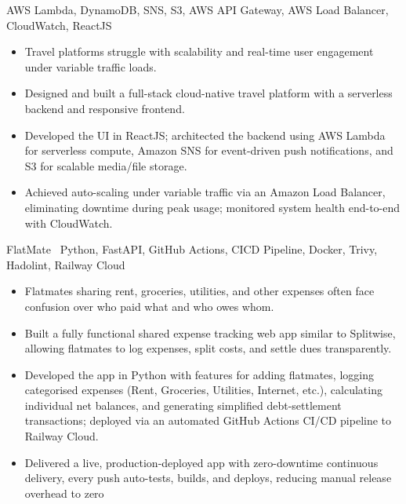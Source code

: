\documentclass[10pt,a4paper,ragged2e]{maltacv}
\begin{document}
{}{}{}
{AWS Lambda, DynamoDB, SNS, S3, AWS API Gateway, AWS Load Balancer, CloudWatch, ReactJS}
\begin{itemize}
  \item  Travel platforms struggle with scalability and real-time user engagement under variable traffic loads.
  \item Designed and built a full-stack cloud-native travel platform with a serverless backend and responsive frontend.
  \item Developed the UI in ReactJS; architected the backend using AWS Lambda for serverless compute, Amazon SNS for event-driven push notifications, and S3 for scalable media/file storage.
  \item Achieved auto-scaling under variable traffic via an Amazon Load Balancer, eliminating downtime during peak usage; monitored system health end-to-end with CloudWatch.
\end{itemize}

\divider

\cvexperience
{FlatMate\ 
\href{https://flat-mate-production.up.railway.app/}{\faExternalLink}
\href{https://github.com/igharjot/Flat-Mate}{\faGithub}}
{}{}{}{Python, FastAPI, GitHub Actions, CICD Pipeline, Docker, Trivy, Hadolint, Railway Cloud}
\begin{itemize}
  \item  Flatmates sharing rent, groceries, utilities, and other expenses often face confusion over who paid what and who owes whom.
  \item Built a fully functional shared expense tracking web app similar to Splitwise, allowing flatmates to log expenses, split costs, and settle dues transparently.
  \item Developed the app in Python with features for adding flatmates, logging categorised expenses (Rent, Groceries, Utilities, Internet, etc.), calculating individual net balances, and generating simplified debt-settlement transactions; deployed via an automated GitHub Actions CI/CD pipeline to Railway Cloud.
  \item Delivered a live, production-deployed app with zero-downtime continuous delivery, every push auto-tests, builds, and deploys, reducing manual release overhead to zero
\end{itemize}


\end{document}
